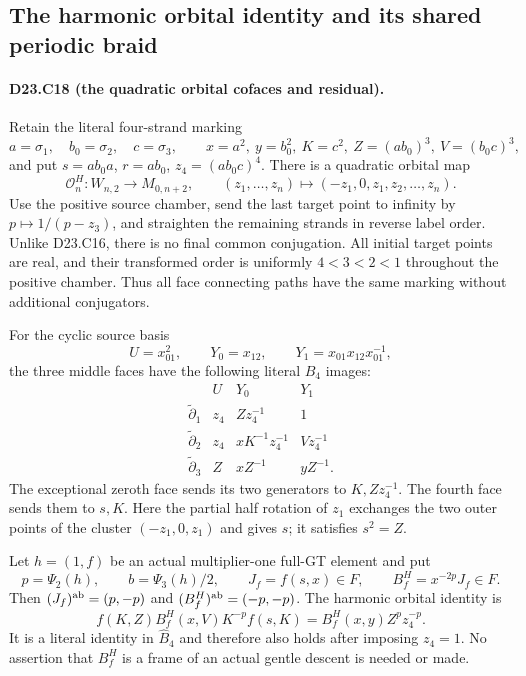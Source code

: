 \subsection{The harmonic orbital identity and its shared periodic braid}

\paragraph{D23.C18 (the quadratic orbital cofaces and residual).}
Retain the literal four-strand marking
\[
 a=\sigma_1,\quad b_0=\sigma_2,\quad c=\sigma_3,\qquad
 x=a^2,\ y=b_0^2,\ K=c^2,\ Z=(ab_0)^3,\ V=(b_0c)^3,
\]
and put $s=ab_0a$, $r=ab_0$, $z_4=(ab_0c)^4$.
There is a quadratic orbital map
\[
 \mathcal O^H_n:W_{n,2}\longrightarrow M_{0,n+2},\qquad
 (z_1,\ldots,z_n)\longmapsto(-z_1,0,z_1,z_2,\ldots,z_n).
\tag{D23.C18.1}
\]
Use the positive source chamber, send the last target point to
infinity by $p\mapsto1/(p-z_3)$, and straighten the remaining
strands in reverse label order. Unlike D23.C16, there is no
final common conjugation. All initial target points are real,
and their transformed order is uniformly $4<3<2<1$ throughout
the positive chamber. Thus all face connecting paths have the
same marking without additional conjugators.

For the cyclic source basis
\[
 U=x_{01}^2,\qquad Y_0=x_{12},\qquad
 Y_1=x_{01}x_{12}x_{01}^{-1},
\]
the three middle faces have the following literal $B_4$ images:
\[
\begin{array}{c|ccc}
 &U&Y_0&Y_1\\\hline
 \widetilde\partial_1&z_4&Zz_4^{-1}&1\\
 \widetilde\partial_2&z_4&xK^{-1}z_4^{-1}&Vz_4^{-1}\\
 \widetilde\partial_3&Z&xZ^{-1}&yZ^{-1}.
\end{array}
\tag{D23.C18.2}
\]
The exceptional zeroth face sends its two generators to
$K,Zz_4^{-1}$. The fourth face sends them to $s,K$.
Here the partial half rotation of $z_1$ exchanges the two
outer points of the cluster $(-z_1,0,z_1)$ and gives $s$;
it satisfies $s^2=Z$.

Let $h=(1,f)$ be an actual multiplier-one full-GT element and put
\[
 p=\Psi_2(h),\qquad b=\Psi_3(h)/2,\qquad
 J_f=f(s,x)\in F,\qquad B^H_f=x^{-2p}J_f\in F.
\tag{D23.C18.3}
\]
Then $(J_f)^{\rm ab}=(p,-p)$ and
$(B^H_f)^{\rm ab}=(-p,-p)$. The harmonic orbital identity is
\[
 \boxed{\quad
 f(K,Z)B^H_f(x,V)K^{-p}f(s,K)
                  =B^H_f(x,y)Z^p z_4^{-p}.
 \quad}
\tag{D23.C18.4}
\]
It is a literal identity in $\widehat B_4$ and therefore also
holds after imposing $z_4=1$. No assertion that $B^H_f$ is a
frame of an actual gentle descent is needed or made.

